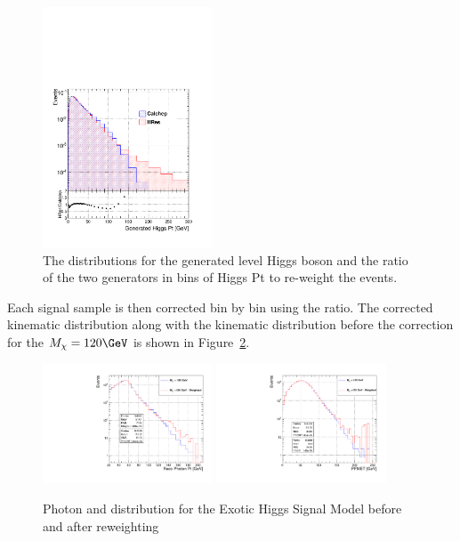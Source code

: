 \begin{figure}[htb]
\begin{center}
\includegraphics[width=0.45\textwidth]{analysis_figs/shape_gen.pdf}
\caption{The distributions for the generated level Higgs boson \ET and the ratio of the two generators in bins of Higgs Pt to re-weight the events.}
\label{fig:shape_gen}
\end{center}
\end{figure}

Each signal sample is then corrected bin by bin using the ratio. The corrected kinematic distribution along with the kinematic distribution before the correction for the $M_\chi = 120 \GeV$ is shown in Figure~\ref{fig:corrected}. 

\begin{figure}[htb]
\begin{center}
{\includegraphics[width=0.45\textwidth]{analysis_figs/signal_photon_reweight.pdf}}\hfill
{\includegraphics[width=0.45\textwidth]{analysis_figs/signal_met_reweight.pdf}}\hfill
\caption{Photon \ET and \met distribution for the Exotic Higgs Signal Model before and after reweighting}
\label{fig:corrected}
\end{center}
\end{figure}




